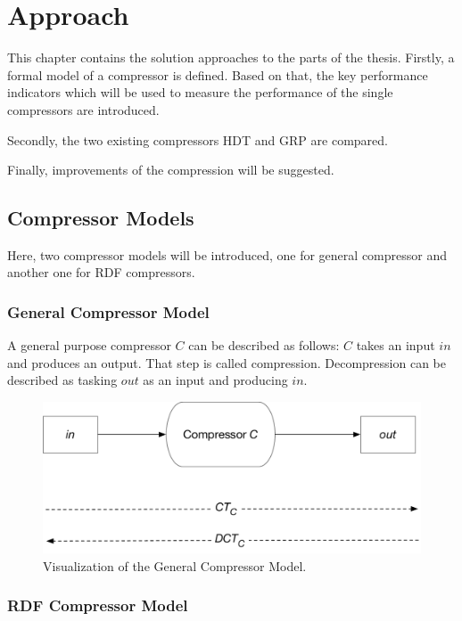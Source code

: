 \chapter{Approach}\label{ch:approach}

This chapter contains the solution approaches to the parts of the thesis. Firstly, a formal model of a compressor is defined. Based on that, the key performance indicators which will be used to measure the performance of the single compressors are introduced.

Secondly, the two existing compressors HDT and GRP are compared.

Finally, improvements of the compression will be suggested.


\section{Compressor Models}

Here, two compressor models will be introduced, one for general compressor and another one for RDF compressors. 

\subsection{General Compressor Model}\label{sec:generalcompressorModel}

A general purpose compressor $C$ can be described as follows: $C$ takes an input $in$ and produces an output. That step is called compression. Decompression can be described as tasking $out$ as an input and producing $in$.

\begin{figure}
	\centering
	\includegraphics[width=0.8\linewidth]{figures/approach/model_general}
	\caption{Visualization of the General Compressor Model.}
	\label{fig:generalcompressorModel}
\end{figure}

\subsection{RDF Compressor Model}\label{sec:compressorModel}

